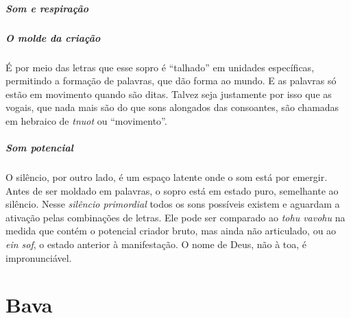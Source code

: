 \paragraph{Som e respiração} 

\paragraph{O molde da criação} É por meio das letras que esse sopro é ``talhado'' em unidades específicas, permitindo a formação de palavras, que dão forma ao mundo. E as palavras só estão em movimento quando são ditas. Talvez seja justamente por isso que as vogais, que nada mais são do que sons alongados das consoantes, são chamadas em hebraico de \textit{tnuot} ou ``movimento''.

\paragraph{Som potencial} O silêncio, por outro lado, é um espaço latente onde o som está por emergir. Antes de ser moldado em palavras, o sopro está em estado puro, semelhante ao silêncio. Nesse \textit{silêncio primordial} todos os sons possíveis existem e aguardam a ativação pelas combinações de letras. Ele pode ser comparado ao \textit{tohu vavohu} na medida que contém o potencial criador bruto, mas ainda não articulado, ou ao \textit{ein sof}, o estado anterior à manifestação. O nome de Deus, não à toa, é impronunciável.

\chapter*{Bava 
\smallskip{}}

\begin{center}
{\huge{}}\\\medskip{\footnotesize\formularlight{
\lipsum[2]
}}
\end{center}

